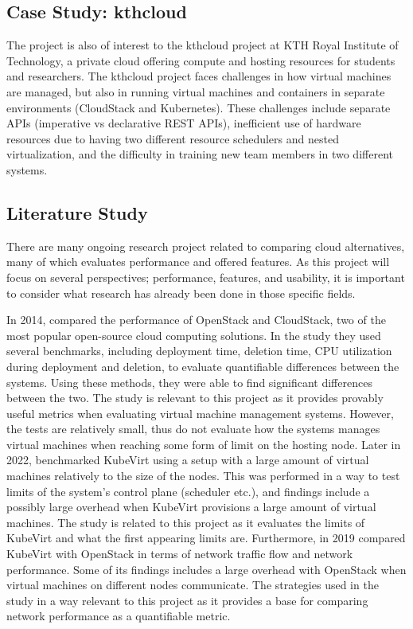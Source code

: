 \documentclass{article}
\begin{document}
\subsection{Case Study: kthcloud}
The project is also of interest to the kthcloud project \cite{kthcloud}\cite{kthcloud-web} at KTH Royal Institute of Technology, a private cloud offering compute and hosting resources for students and researchers. The kthcloud project faces challenges in how virtual machines are managed, but also in running virtual machines and containers in separate environments (CloudStack and Kubernetes). These challenges include separate APIs (imperative vs declarative REST APIs), inefficient use of hardware resources due to having two different resource schedulers and nested virtualization, and the difficulty in training new team members in two different systems. 


\subsection{Literature Study}
There are many ongoing research project related to comparing cloud alternatives, many of which evaluates performance and offered features. As this project will focus on several perspectives; performance, features, and usability, it is important to consider what research has already been done in those specific fields. 

In 2014, \cite{cs-os-benchmark} compared the performance of OpenStack and CloudStack, two of the most popular open-source cloud computing solutions. In the study they used several benchmarks, including deployment time, deletion time, CPU utilization during deployment and deletion, to evaluate quantifiable differences between the systems. Using these methods, they were able to find significant differences between the two. The study is relevant to this project as it provides provably useful metrics when evaluating virtual machine management systems. However, the tests are relatively small, thus do not evaluate how the systems manages virtual machines when reaching some form of limit on the hosting node. Later in 2022, \cite{ibm-kubevirt-scale} benchmarked KubeVirt using a setup with a large amount of virtual machines relatively to the size of the nodes. This was performed in a way to test limits of the system's control plane (scheduler etc.), and findings include a possibly large overhead when KubeVirt provisions a large amount of virtual machines. The study is related to this project as it evaluates the limits of KubeVirt and what the first appearing limits are. Furthermore, in 2019 \cite{openstack-kubevirt-network} compared KubeVirt with OpenStack in terms of network traffic flow and network performance. Some of its findings includes a large overhead with OpenStack when virtual machines on different nodes communicate. The strategies used in the study in a way relevant to this project as it provides a base for comparing network performance as a quantifiable metric.
\end{document}

